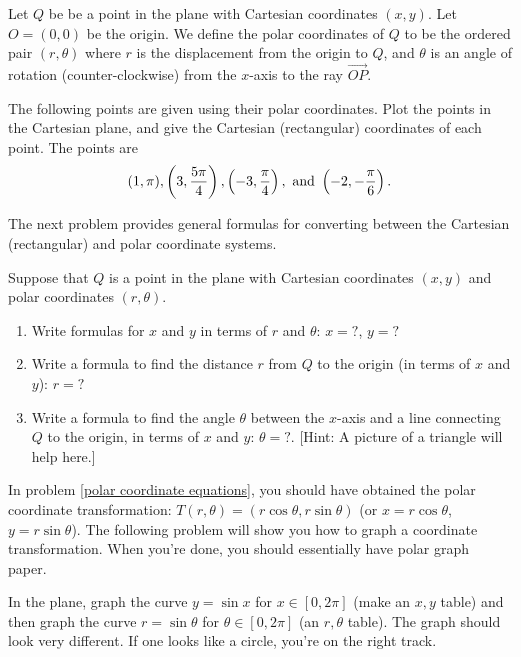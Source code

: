 \begin{definition}
Let $Q$ be be a point in the plane with Cartesian coordinates $(x,y)$.  Let $O=(0,0)$ be the origin. We define the polar coordinates of $Q$ to be the ordered pair $(r,\theta)$ where $r$ is the displacement from the origin to $Q$, and $\theta$ is an angle of rotation (counter-clockwise) from the $x$-axis to the ray $\vec {OP}$.
\end{definition}

\begin{problem}  
The following points are given using their polar coordinates.  Plot the points in the Cartesian plane, and give the Cartesian (rectangular) coordinates of each point. The points are
$$
(1,\pi), 
\displaystyle \left( 3,\frac{5\pi}{4}\right),
\displaystyle \left( -3,\frac{\pi}{4}\right),\text{ and }
\displaystyle \left( -2,-\frac{\pi}{6}\right).$$
\end{problem}

The next problem provides general formulas for converting between the Cartesian (rectangular) and polar coordinate systems.

\begin{problem}\label{polar coordinate equations}  
Suppose that $Q$ is a point in the plane with Cartesian coordinates $(x,y)$ and polar coordinates $(r,\theta)$.  
\begin{enumerate}
\item Write formulas for $x$ and $y$ in terms of $r$ and $\theta$: $x=?$, $y=?$
\item Write a formula to find the distance $r$ from $Q$ to the origin (in terms of $x$ and $y$): $r=?$
\item Write a formula to find the angle $\theta$ between the $x$-axis and a line connecting $Q$ to the origin, in terms of $x$ and $y$: $\theta = ?$. [Hint: A picture of a triangle will help here.]
\end{enumerate}
\end{problem}
 
In problem \ref{polar coordinate equations}, you should have obtained the polar coordinate transformation: $T(r,\theta)=(r\cos\theta, r\sin\theta)$ (or $x=r\cos\theta$, $y=r\sin\theta$).  The following problem will show you how to graph a coordinate transformation.  When you're done, you should essentially have polar graph paper.

\begin{problem} 
In the plane, graph the curve $y=\sin x$ for $x\in[0,2\pi]$ (make an $x,y$ table) and then graph the curve $r=\sin\theta$ for $\theta\in[0,2\pi]$ (an $r,\theta$ table).  The graph should look very different.  If one looks like a circle, you're on the right track.  
\end{problem}

